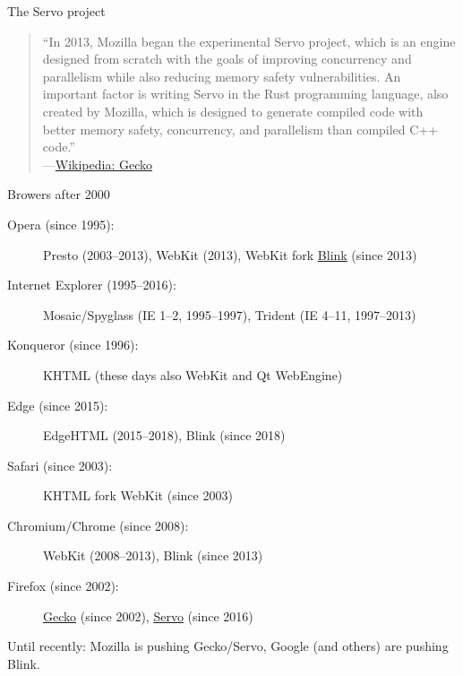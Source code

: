 \documentclass{beamer}
\begin{document}

\begin{frame}[fragile]{The Servo project}
  \begin{quote}
    “In 2013, Mozilla began the experimental Servo project, which is an engine designed from scratch with the goals of improving concurrency and parallelism while also reducing memory safety vulnerabilities. An important factor is writing Servo in the Rust programming language, also created by Mozilla, which is designed to generate compiled code with better memory safety, concurrency, and parallelism than compiled C++ code.” \\
    ---\href{https://en.wikipedia.org/w/index.php?title=Gecko_(software)&oldid=967690910#Background}{Wikipedia: Gecko}
  \end{quote}
\end{frame}

\begin{frame}[fragile]{Browers after 2000}
  \begin{description}
    \item[Opera (since 1995):] Presto (2003--2013), WebKit (2013), WebKit fork \href{https://chromium.googlesource.com/chromium/src/+/master/third_party/blink/}{Blink} (since 2013)
    \item[Internet Explorer (1995--2016):] Mosaic/Spyglass (IE 1--2, 1995--1997), Trident (IE 4--11, 1997--2013)
    \item[Konqueror (since 1996):] KHTML (these days also WebKit and Qt WebEngine)
    \item[Edge (since 2015):] EdgeHTML (2015--2018), Blink (since 2018)
    \item[Safari (since 2003):] KHTML fork WebKit (since 2003)
    \item[Chromium/Chrome (since 2008):] WebKit (2008--2013), Blink (since 2013)
    \item[Firefox (since 2002):] \href{https://developer.mozilla.org/en-US/docs/Mozilla/Gecko}{Gecko} (since 2002), \href{https://github.com/servo/servo}{Servo} (since 2016)
  \end{description}

  Until recently: Mozilla is pushing Gecko/Servo, Google (and others) are pushing Blink.
\end{frame}
\end{document}
